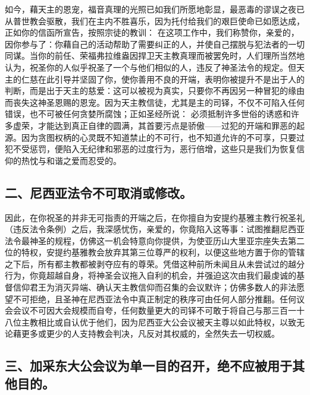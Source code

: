 如今，藉天主的恩宠，福音真理的光照已如我们所愿地彰显，最恶毒的谬误之夜已从普世教会驱散，我们在主内不胜喜乐，因为托付给我们的艰巨使命已如愿达成，正如你的信函所宣告，按照宗徒的教训： 在这项工作中，我们称赞你，亲爱的，因你参与了：你藉自己的活动帮助了需要纠正的人，并使自己摆脱与犯法者的一切同谋。当你的前任、荣福弗拉维盎因捍卫天主教真理而被罢免时，人们理所当然地认为，祝圣你的人似乎祝圣了一个与他们相似的人，违反了神圣法令的规定。但天主的仁慈在此引导并坚固了你，使你善用不良的开端，表明你被提升不是出于人的判断，而是出于天主的慈爱：这可以被视为真实，只要你不再因另一种冒犯的缘由而丧失这神圣恩赐的恩宠。因为天主教信徒，尤其是主的司铎，不仅不可陷入任何错误，也不可被任何贪婪所腐蚀；正如圣经所说： 必须抵制许多世俗的诱惑和许多虚荣，才能达到真正自律的圆满，其首要污点是骄傲——过犯的开端和罪恶的起源。因为贪图权柄的心灵既不知道禁止的不可行，也不知道允许的不可享，只要过犯不受惩罚，便陷入无纪律和邪恶的过度行为，恶行倍增，这些只是我们为恢复信仰的热忱与和谐之爱而忍受的。\par


\subsection{二、尼西亚法令不可取消或修改。}

因此，在你祝圣的并非无可指责的开端之后，在你擅自为安提约基雅主教行祝圣礼（违反法令条例）之后，我深感忧伤，亲爱的，你竟陷入这等事：试图推翻尼西亚法令最神圣的规程，仿佛这一机会特意向你提供，为使亚历山大里亚宗座失去第二位的特权，安提约基雅教会放弃其第三位尊严的权利，以便这些地方置于你的管辖之下后，所有都主教都被剥夺应有的尊荣。凭借这种前所未闻且从未尝试过的越分行为，你竟超越自身，将神圣会议拖入自利的机会，并强迫这次由我们最虔诚的基督信仰君王为消灭异端、确认天主教信仰而召集的会议默许；仿佛多数人的非法愿望不可拒绝，且圣神在尼西亚法令中真正制定的秩序可由任何人部分推翻。任何议会会议不可因大会规模而自夸，任何数量更大的司铎不可敢于将自己与那三百一十八位主教相比或自认优于他们，因为尼西亚大公会议被天主尊以如此特权，以致无论藉更多或更少的人支持教会判决，凡反对其权威的，全然失去一切权威。\par


\subsection{三、加采东大公会议为单一目的召开，绝不应被用于其他目的。}

